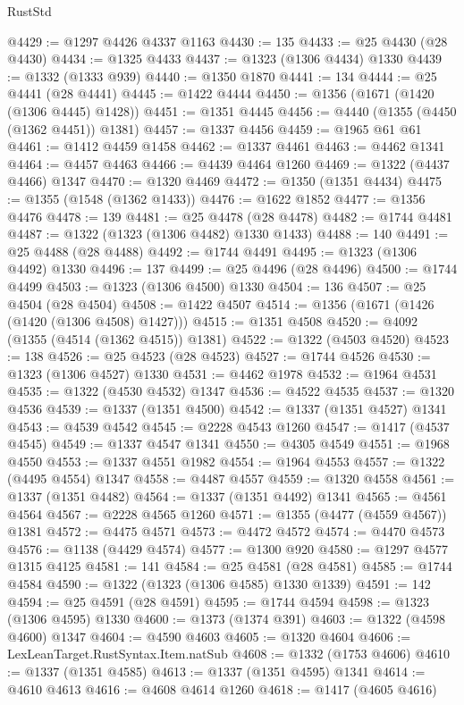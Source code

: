 \begin{lexlean}{RustStd}
\begin{coremodule}
@4429 := @1297 @4426 @4337 @1163
@4430 := 135
@4433 := @25 @4430 (@28 @4430)
@4434 := @1325 @4433
@4437 := @1323 (@1306 @4434) @1330
@4439 := @1332 (@1333 @939)
@4440 := @1350 @1870
@4441 := 134
@4444 := @25 @4441 (@28 @4441)
@4445 := @1422 @4444
@4450 := @1356 (@1671 (@1420 (@1306 @4445) @1428))
@4451 := @1351 @4445
@4456 := @4440 (@1355 (@4450 (@1362 @4451)) @1381)
@4457 := @1337 @4456
@4459 := @1965 @61 @61
@4461 := @1412 @4459 @1458
@4462 := @1337 @4461
@4463 := @4462 @1341
@4464 := @4457 @4463
@4466 := @4439 @4464 @1260
@4469 := @1322 (@4437 @4466) @1347
@4470 := @1320 @4469
@4472 := @1350 (@1351 @4434)
@4475 := @1355 (@1548 (@1362 @1433))
@4476 := @1622 @1852
@4477 := @1356 @4476
@4478 := 139
@4481 := @25 @4478 (@28 @4478)
@4482 := @1744 @4481
@4487 := @1322 (@1323 (@1306 @4482) @1330 @1433)
@4488 := 140
@4491 := @25 @4488 (@28 @4488)
@4492 := @1744 @4491
@4495 := @1323 (@1306 @4492) @1330
@4496 := 137
@4499 := @25 @4496 (@28 @4496)
@4500 := @1744 @4499
@4503 := @1323 (@1306 @4500) @1330
@4504 := 136
@4507 := @25 @4504 (@28 @4504)
@4508 := @1422 @4507
@4514 := @1356 (@1671 (@1426 (@1420 (@1306 @4508) @1427)))
@4515 := @1351 @4508
@4520 := @4092 (@1355 (@4514 (@1362 @4515)) @1381)
@4522 := @1322 (@4503 @4520)
@4523 := 138
@4526 := @25 @4523 (@28 @4523)
@4527 := @1744 @4526
@4530 := @1323 (@1306 @4527) @1330
@4531 := @4462 @1978
@4532 := @1964 @4531
@4535 := @1322 (@4530 @4532) @1347
@4536 := @4522 @4535
@4537 := @1320 @4536
@4539 := @1337 (@1351 @4500)
@4542 := @1337 (@1351 @4527) @1341
@4543 := @4539 @4542
@4545 := @2228 @4543 @1260
@4547 := @1417 (@4537 @4545)
@4549 := @1337 @4547 @1341
@4550 := @4305 @4549
@4551 := @1968 @4550
@4553 := @1337 @4551 @1982
@4554 := @1964 @4553
@4557 := @1322 (@4495 @4554) @1347
@4558 := @4487 @4557
@4559 := @1320 @4558
@4561 := @1337 (@1351 @4482)
@4564 := @1337 (@1351 @4492) @1341
@4565 := @4561 @4564
@4567 := @2228 @4565 @1260
@4571 := @1355 (@4477 (@4559 @4567)) @1381
@4572 := @4475 @4571
@4573 := @4472 @4572
@4574 := @4470 @4573
@4576 := @1138 (@4429 @4574)
@4577 := @1300 @920
@4580 := @1297 @4577 @1315 @4125
@4581 := 141
@4584 := @25 @4581 (@28 @4581)
@4585 := @1744 @4584
@4590 := @1322 (@1323 (@1306 @4585) @1330 @1339)
@4591 := 142
@4594 := @25 @4591 (@28 @4591)
@4595 := @1744 @4594
@4598 := @1323 (@1306 @4595) @1330
@4600 := @1373 (@1374 @391)
@4603 := @1322 (@4598 @4600) @1347
@4604 := @4590 @4603
@4605 := @1320 @4604
@4606 := LexLeanTarget.RustSyntax.Item.natSub
@4608 := @1332 (@1753 @4606)
@4610 := @1337 (@1351 @4585)
@4613 := @1337 (@1351 @4595) @1341
@4614 := @4610 @4613
@4616 := @4608 @4614 @1260
@4618 := @1417 (@4605 @4616)

\end{coremodule}
\end{lexlean}

